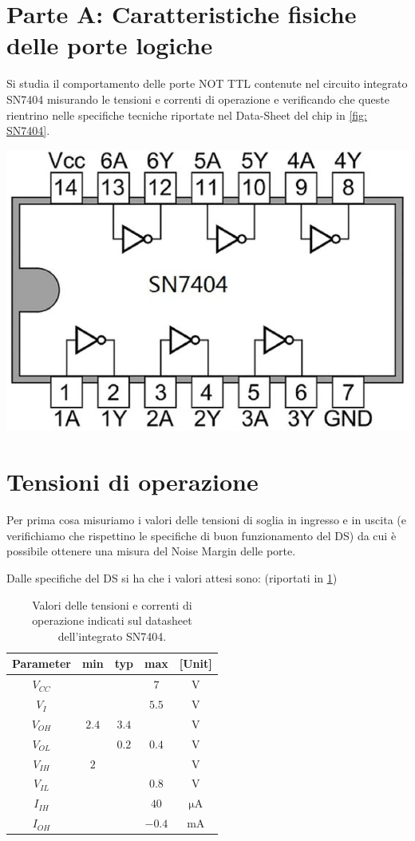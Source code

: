 \documentclass[10pt, a4paper, italian]{article}
\begin{document}
\section*{Parte A: Caratteristiche fisiche delle porte logiche}
Si studia il comportamento delle porte NOT TTL contenute nel circuito integrato SN7404 misurando le tensioni e correnti di operazione e verificando che queste rientrino nelle specifiche tecniche riportate nel Data-Sheet del chip in \cref{fig: SN7404}.
\begin{minipage}{0.3\textwidth}
    \includegraphics[width=\textwidth]{SN7404}
    
    \label{fig: SN7404}
\end{minipage}

\section{Tensioni di operazione}\label{sec: tens}
Per prima cosa misuriamo i valori delle tensioni di soglia in ingresso e in
uscita (e verifichiamo che rispettino le specifiche di buon funzionamento del
DS) da cui è possibile ottenere una misura del Noise Margin delle porte.

Dalle specifiche del DS si ha che i valori attesi sono: (riportati in
\cref{tab: notDS})
\begin{table}[htb]
\centering
\begin{tabular}{cccc|c}
\toprule
Parameter  & min & typ & max & [Unit] \\
\midrule
\midrule
$V_{CC}$ &  &  & $7$ & V \\
$V_I$	 &  &  & $5.5$ & V\\
$V_{OH}$ & $2.4$  & $3.4$ & & V \\
$V_{OL}$ &   & $0.2$ & $0.4$ & V \\
$V_{IH}$ & $2$  &  & & V  \\
$V_{IL}$ &  &  & $0.8$ & V \\
$I_{IH}$ &  &  & $40$ & $\si{\micro\A}$ \\
$I_{OH}$ &  &  & $-0.4$ & mA \\
\bottomrule 
\end{tabular}
\caption{Valori delle tensioni e correnti di operazione indicati sul
datasheet dell'integrato SN7404.}
\label{tab: notDS}
\end{table}
\end{document}
